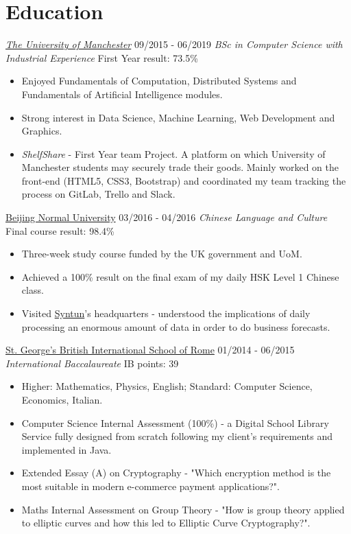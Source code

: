 \documentclass[]{friggeri-cv}
\begin{document}
\section{\color{red}Edu\color{gray}cation}
\begin{entrylist}
  \entry
    {}
    {\emph{\href{http://www.manchester.ac.uk/}{The University of Manchester}}}
    {09/2015 - 06/2019}
    {\emph{BSc in Computer Science with Industrial Experience}}
    {First Year result: 73.5\%}
    \begin{itemize}
        \item Enjoyed Fundamentals of Computation, Distributed Systems and Fundamentals of Artificial Intelligence modules.
        \item Strong interest in Data Science, Machine Learning, Web Development and Graphics.
        \item \emph{ShelfShare} - First Year team Project. A platform on which University of Manchester students may securely trade their goods. Mainly worked on the front-end (HTML5, CSS3, Bootstrap) and coordinated my team tracking the process on GitLab, Trello and Slack.\\
    \end{itemize}
  \entry
    {}
    {\href{http://english.bnu.edu.cn/}{Beijing Normal University}}
    {03/2016 - 04/2016}
    {\emph{Chinese Language and Culture}}
    {Final course result: 98.4\%}
    \begin{itemize}
        \item Three-week study course funded by the UK government and UoM.
        \item Achieved a 100\% result on the final exam of my daily HSK Level 1 Chinese class.
        \item Visited \href{http://www.syntun.com/}{Syntun}'s headquarters - understood the implications of daily processing an enormous amount of data in order to do business forecasts.\\
    \end{itemize}
  \entry
    {}
    {\href{http://www.stgeorge.school.it/}{St. George's British International School of Rome}}
    {01/2014 - 06/2015}
    {\emph{International Baccalaureate}}
    {IB points: 39}
    \begin{itemize}
        \item Higher: Mathematics, Physics, English; Standard: Computer Science, Economics, Italian.
        \item Computer Science Internal Assessment (100\%) - a Digital School Library Service fully designed from scratch following my client's requirements and implemented in Java.
        \item Extended Essay (A) on Cryptography - "Which encryption method is the most suitable in modern e-commerce payment applications?".
        \item Maths Internal Assessment on Group Theory - "How is group theory applied to elliptic curves and how this led to Elliptic Curve Cryptography?". \\
    \end{itemize}
\end{entrylist}
\end{document}
